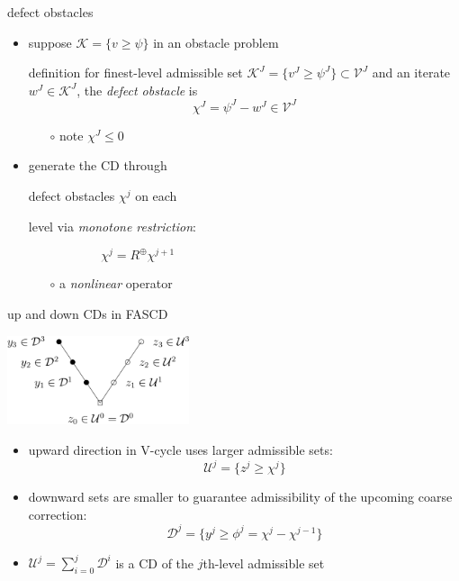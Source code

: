 \documentclass[svgnames,
               hyperref={colorlinks,citecolor=DeepPink4,linkcolor=FireBrick,urlcolor=Maroon},
               usepdftitle=false]  %
               {beamer}
\newcommand{\ds}{\displaystyle}
\begin{document}
\begin{frame}{defect obstacles}

\begin{itemize}
\item suppose $\mathcal{K} = \{v \ge \psi\}$ in an obstacle problem
\begin{block}{definition}
for finest-level admissible set $\mathcal{K}^J = \{v^J\ge \psi^J\} \subset \mathcal{V}^J$ and an iterate $w^J \in \mathcal{K}^J$, the \emph{defect obstacle} is
    $$\chi^J = \psi^J - w^J \in \mathcal{V}^J$$
\end{block}

    \begin{itemize}
    \item[$\circ$] note $\chi^J \le 0$
    \end{itemize}
\item generate the CD through

defect obstacles $\chi^j$ on each

level via \emph{monotone restriction}:

$$\chi^j = R^{\oplus} \chi^{j+1} \phantom{smdlfkaj asdfklj asdf sdfaa asddfas dsa}$$

    \begin{itemize}
    \item[$\circ$] a \emph{nonlinear} operator
    \end{itemize}
\end{itemize}

\vspace{-25mm}
\hfill \mbox{}
\end{frame}


\begin{frame}{up and down CDs in FASCD}

\begin{center}
\includegraphics[width=0.4\textwidth]{../talk-oxford/images/fascd-vcycle.png}
\end{center}

\begin{itemize}
\item upward direction in V-cycle uses larger admissible sets:
    $$\mathcal{U}^j = \{z^j \ge \chi^j\}$$
\item downward sets are smaller to guarantee admissibility of the upcoming coarse correction:
    $$\mathcal{D}^j = \{y^j \ge \phi^j=\chi^j - \chi^{j-1}\}$$
\item $\ds \mathcal{U}^j = \sum_{i=0}^j \mathcal{D}^i$ is a CD of the $j$th-level admissible set
\end{itemize}
\end{frame}
\end{document}
